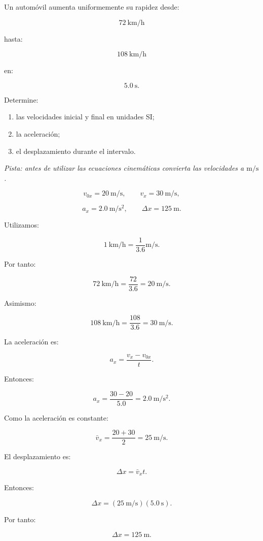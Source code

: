 \begin{ejercicio}
Un automóvil aumenta uniformemente su rapidez desde:

\[ \SI{72}{\kilo\meter\per\hour} \]

hasta:

\[ \SI{108}{\kilo\meter\per\hour} \]

en:

\[ \SI{5.0}{\second}. \]

Determine:

\begin{enumerate}[label=\alph*)]
    \item las velocidades inicial y final en unidades SI;
    \item la aceleración;
    \item el desplazamiento durante el intervalo.
\end{enumerate}

\textit{Pista: antes de utilizar las ecuaciones cinemáticas convierta las velocidades a \(\si{\meter\per\second}\).}
\end{ejercicio}

\begin{respuesta}
\[
v_{0x}=\SI{20}{\meter\per\second},
\qquad
v_x=\SI{30}{\meter\per\second},
\]

\[
a_x=\SI{2.0}{\meter\per\second\squared},
\qquad
\Delta x=\SI{125}{\meter}.
\]
\end{respuesta}

\begin{explicacion}
Utilizamos:

\[
\SI{1}{\kilo\meter\per\hour}
=
\frac{1}{3.6}\si{\meter\per\second}.
\]

Por tanto:

\[
\SI{72}{\kilo\meter\per\hour}
=
\frac{72}{3.6}
=
\boxed{\SI{20}{\meter\per\second}}.
\]

Asimismo:

\[
\SI{108}{\kilo\meter\per\hour}
=
\frac{108}{3.6}
=
\boxed{\SI{30}{\meter\per\second}}.
\]

La aceleración es:

\[
a_x
=
\frac{v_x-v_{0x}}{t}.
\]

Entonces:

\[
a_x
=
\frac{30-20}{5.0}
=
\boxed{\SI{2.0}{\meter\per\second\squared}}.
\]

Como la aceleración es constante:

\[
\bar{v}_x
=
\frac{20+30}{2}
=
\SI{25}{\meter\per\second}.
\]

El desplazamiento es:

\[
\Delta x
=
\bar{v}_xt.
\]

Entonces:

\[
\Delta x
=
(\SI{25}{\meter\per\second})
(\SI{5.0}{\second}).
\]

Por tanto:

\[ \boxed{\Delta x=\SI{125}{\meter}}. \]
\end{explicacion}


